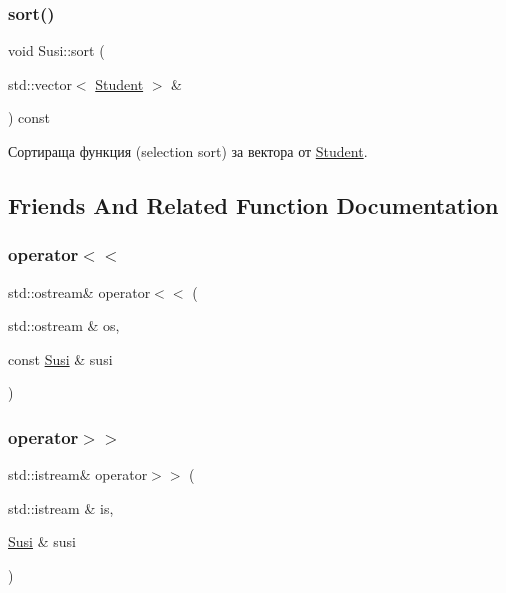 \subsubsection{\texorpdfstring{sort()}{sort()}}
{\footnotesize\ttfamily void Susi\+::sort (\begin{DoxyParamCaption}\item[{std\+::vector$<$ \hyperlink{class_student}{Student} $>$ \&}]{ }\end{DoxyParamCaption}) const}



Сортираща функция (selection sort) за вектора от \hyperlink{class_student}{Student}. 



\subsection{Friends And Related Function Documentation}
\mbox{\label{class_susi_a19986b37cae9f955a39548b141c5505d}} 
\subsubsection{\texorpdfstring{operator$<$$<$}{operator<<}}
{\footnotesize\ttfamily std\+::ostream\& operator$<$$<$ (\begin{DoxyParamCaption}\item[{std\+::ostream \&}]{os,  }\item[{const \hyperlink{class_susi}{Susi} \&}]{susi }\end{DoxyParamCaption})\hspace{0.3cm}{\ttfamily [friend]}}

\mbox{\label{class_susi_a2cc9661c48db37bc6a525e4fe567ec23}} 
\subsubsection{\texorpdfstring{operator$>$$>$}{operator>>}}
{\footnotesize\ttfamily std\+::istream\& operator$>$$>$ (\begin{DoxyParamCaption}\item[{std\+::istream \&}]{is,  }\item[{\hyperlink{class_susi}{Susi} \&}]{susi }\end{DoxyParamCaption})\hspace{0.3cm}{\ttfamily [friend]}}



